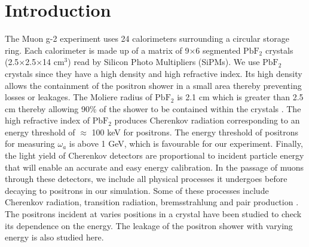 \documentclass[article,accept,moreauthors,pdftex,10pt,a4paper]{../MDPI_template/Definitions/mdpi}
\begin{document}

\section{Introduction}
The Muon g-2 experiment uses 24 calorimeters surrounding a circular storage ring. Each calorimeter is made up of 
a matrix of 9$\times$6 segmented $\mathrm{PbF_2}$ crystals (2.5$\times$2.5$\times$14 cm$^3$) read by 
Silicon Photo Multipliers (SiPMs). We use $\mathrm{PbF_2}$ crystals since they have a high density 
and high refractive index. 
Its high density allows the containment of the positron shower in a small area  
thereby preventing losses or leakages. The Moliere radius of $\mathrm{PbF_2}$ is 2.1 cm which is greater than 
2.5 cm thereby allowing 90\% of the shower to be contained within the crystals \cite{c1}. 
The high refractive index of $\mathrm{PbF_2}$ produces Cherenkov radiation corresponding to an energy threshold 
of $\approx$ 100 keV for positrons. The energy threshold of positrons for measuring $\omega_a$ is above 1 GeV, which is 
favourable for our experiment. Finally, the light yield of Cherenkov detectors are proportional to incident 
particle energy that will enable an accurate and easy energy calibration. 
In the passage of muons through these detectors, we include all physical processes it undergoes before decaying to 
positrons in our simulation. Some of these processes include Cherenkov radiation, transition radiation, bremsstrahlung 
and pair production \cite{c2}. %
The positrons incident at varies positions in a crystal have been studied to check its dependence on the energy.
The leakage of the positron shower with varying energy is also studied here.  

\noindent 
\end{document}
